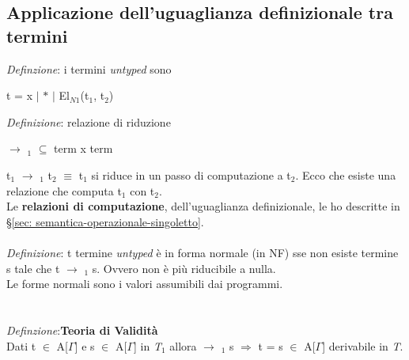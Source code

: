 \subsection{Applicazione dell'uguaglianza definizionale tra termini}
\label{subsec: applicazione-uguaglianza-definizionale-tra-termini}
\textit{Definzione}: i termini \textit{untyped} sono
\begin{center}t = x $|$ $\ast$ $|$ El$_{N1}$(t$_1$, t$_2$)\end{center}
\textit{Definizione}: relazione di riduzione
\begin{center}$\rightarrow$ $_1$ $\subseteq$ term x term\end{center}
t$_1$ $\rightarrow$ $_1$ t$_2$ $\equiv$ t$_1$ si riduce in un passo di computazione a t$_2$. Ecco che esiste una relazione che computa t$_1$ con t$_2$.\\
Le \textbf{relazioni di computazione}, dell'uguaglianza definizionale, le ho descritte in \S\ref{sec: semantica-operazionale-singoletto}.
\\\\
\textit{Definizione}: t termine \textit{untyped} \`e in forma normale (in NF) sse non esiste termine s tale che t $\rightarrow$ $_1$ s. Ovvero non \`e pi\`u riducibile a nulla. \\  Le forme normali sono i valori assumibili dai programmi.\\
\\\\
\textit{Definzione}:\textbf{Teoria di Validit\`a}\\ Dati t $\in$ A[$\Gamma$] e s $\in$ A[$\Gamma$] in \textit{T$_1$} \quad allora \quad $\rightarrow$ $_1$ s $\Rightarrow$ t = s $\in$ A[$\Gamma$] derivabile in \textit{T}.


